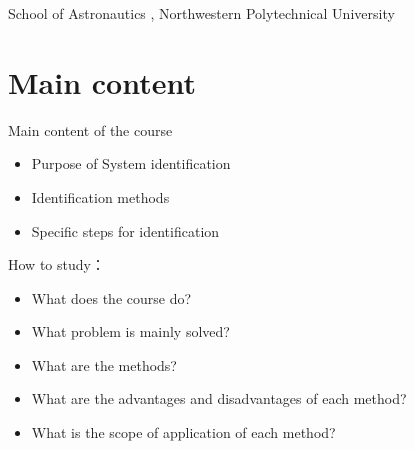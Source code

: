 

\def\lecturename{System Identification}

\title{\insertlecture}

\author{Xing Chao}

\institute
{
  School of Astronautics , Northwestern Polytechnical University
}


\subtitle{Basic concepts in System Identification}
\date{2012}



\begin{frame}
  \maketitle
\end{frame}





\section{Main content}

\begin{frame}{Main content of the course}
\begin{itemize}
\item Purpose of System identification
\item Identification methods
\item Specific steps for identification
\end{itemize}
How to study：
\begin{itemize}
\item What does the course do?
\item What problem is mainly solved?
\item What are the methods?
\item What are the advantages and disadvantages of each method?
\item What is the scope of application of each method?
\end{itemize}
\end{frame}

